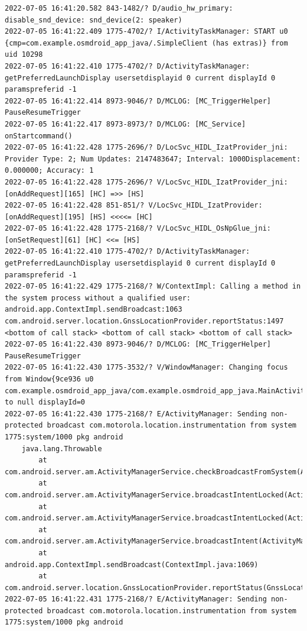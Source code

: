 \documentclass[a4paper,12pt]{book}
\begin{document}
\begin{lstlisting}
2022-07-05 16:41:20.582 843-1482/? D/audio_hw_primary: disable_snd_device: snd_device(2: speaker)
2022-07-05 16:41:22.409 1775-4702/? I/ActivityTaskManager: START u0 {cmp=com.example.osmdroid_app_java/.SimpleClient (has extras)} from uid 10298
2022-07-05 16:41:22.410 1775-4702/? D/ActivityTaskManager: getPreferredLaunchDisplay usersetdisplayid 0 current displayId 0 paramspreferid -1
2022-07-05 16:41:22.414 8973-9046/? D/MCLOG: [MC_TriggerHelper] PauseResumeTrigger
2022-07-05 16:41:22.417 8973-8973/? D/MCLOG: [MC_Service] onStartcommand()
2022-07-05 16:41:22.428 1775-2696/? D/LocSvc_HIDL_IzatProvider_jni: Provider Type: 2; Num Updates: 2147483647; Interval: 1000Displacement: 0.000000; Accuracy: 1
2022-07-05 16:41:22.428 1775-2696/? V/LocSvc_HIDL_IzatProvider_jni: [onAddRequest][165] [HC] =>> [HS]
2022-07-05 16:41:22.428 851-851/? V/LocSvc_HIDL_IzatProvider: [onAddRequest][195] [HS] <<<<= [HC]
2022-07-05 16:41:22.428 1775-2168/? V/LocSvc_HIDL_OsNpGlue_jni: [onSetRequest][61] [HC] <<= [HS]
2022-07-05 16:41:22.410 1775-4702/? D/ActivityTaskManager: getPreferredLaunchDisplay usersetdisplayid 0 current displayId 0 paramspreferid -1
2022-07-05 16:41:22.429 1775-2168/? W/ContextImpl: Calling a method in the system process without a qualified user: android.app.ContextImpl.sendBroadcast:1063 com.android.server.location.GnssLocationProvider.reportStatus:1497 <bottom of call stack> <bottom of call stack> <bottom of call stack> 
2022-07-05 16:41:22.430 8973-9046/? D/MCLOG: [MC_TriggerHelper] PauseResumeTrigger
2022-07-05 16:41:22.430 1775-3532/? V/WindowManager: Changing focus from Window{9ce936 u0 com.example.osmdroid_app_java/com.example.osmdroid_app_java.MainActivity} to null displayId=0
2022-07-05 16:41:22.430 1775-2168/? E/ActivityManager: Sending non-protected broadcast com.motorola.location.instrumentation from system 1775:system/1000 pkg android
    java.lang.Throwable
        at com.android.server.am.ActivityManagerService.checkBroadcastFromSystem(ActivityManagerService.java:15425)
        at com.android.server.am.ActivityManagerService.broadcastIntentLocked(ActivityManagerService.java:15979)
        at com.android.server.am.ActivityManagerService.broadcastIntentLocked(ActivityManagerService.java:15442)
        at com.android.server.am.ActivityManagerService.broadcastIntent(ActivityManagerService.java:16227)
        at android.app.ContextImpl.sendBroadcast(ContextImpl.java:1069)
        at com.android.server.location.GnssLocationProvider.reportStatus(GnssLocationProvider.java:1497)
2022-07-05 16:41:22.431 1775-2168/? E/ActivityManager: Sending non-protected broadcast com.motorola.location.instrumentation from system 1775:system/1000 pkg android

\end{lstlisting}
\end{document}
